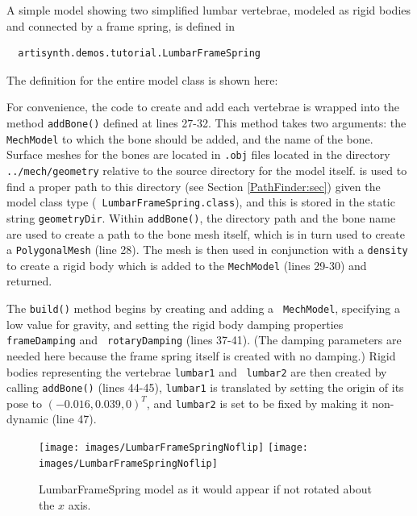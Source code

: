 A simple model showing two simplified lumbar vertebrae, modeled as
rigid bodies and connected by a frame spring, is defined in
%
\begin{verbatim}
  artisynth.demos.tutorial.LumbarFrameSpring
\end{verbatim}
%
The definition for the entire model class is shown here:
\lstset{numbers=left}

\lstset{numbers=none}

For convenience, the code to create and add each vertebrae is wrapped
into the method {\tt addBone()} defined at lines 27-32. This method
takes two arguments: the {\tt MechModel} to which the bone should be
added, and the name of the bone. Surface meshes for the bones are
located in {\tt .obj} files located in the directory {\tt
../mech/geometry} relative to the source directory for the model
itself.
is used to find a proper path to this directory (see Section
\ref{PathFinder:sec}) given the model class type ({\tt
LumbarFrameSpring.class}), and this is stored in the static string
{\tt geometryDir}. Within {\tt addBone()}, the directory path and the
bone name are used to create a path to the bone mesh itself, which is
in turn used to create a {\tt PolygonalMesh} (line 28). The mesh is
then used in conjunction with a {\tt density} to create a rigid body
which is added to the {\tt MechModel} (lines 29-30) and returned.

The {\tt build()} method begins by creating and adding a {\tt
MechModel}, specifying a low value for gravity, and setting the rigid
body damping properties {\tt frameDamping} and {\tt
rotaryDamping} (lines 37-41). (The damping parameters are needed
here because the frame spring itself is created with no damping.)
Rigid bodies representing the vertebrae {\tt lumbar1} and {\tt
lumbar2} are then created by calling {\tt addBone()} (lines 44-45),
{\tt lumbar1} is translated by setting the origin of its pose to
$(-0.016, 0.039, 0)^T$, and {\tt lumbar2} is set to be fixed by making
it non-dynamic (line 47).

\begin{figure}[ht]
\begin{center}
\iflatexml
 \texttt{[image: images/LumbarFrameSpringNoflip]}
\else
 \texttt{[image: images/LumbarFrameSpringNoflip]}
\fi
\end{center}
\caption{LumbarFrameSpring model as it would appear if not rotated
about the $x$ axis.}
\label{LumbarFrameSpringNoflip:fig}
\end{figure}

